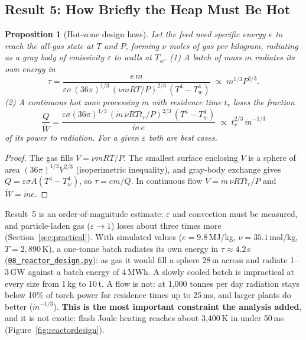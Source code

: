 \documentclass[11pt,a4paper]{article}
\newcommand{\gh}[2]{\href{https://github.com/syncaissa/paramanu-reclaimer/blob/main/#1}{\texttt{#2}}}
\theoremstyle{definition}
\theoremstyle{plain}
\newtheorem{proposition}{Proposition}[section]
\theoremstyle{remark}
\begin{document}
\subsection{Result 5: How Briefly the Heap Must Be Hot}
\begin{proposition}[Hot-zone design laws]\label{prop:hotzone}
Let the feed need specific energy $e$ to reach the all-gas state at $T$ and $P$, forming $\nu$ moles of gas per kilogram, radiating as a gray body of emissivity $\varepsilon$ to walls at $T_w$. (1) A batch of mass $m$ radiates its own energy in
\begin{equation}\label{eq:tau}
\tau = \frac{e\,m}{\varepsilon\sigma\,(36\pi)^{1/3}\,(\nu m R T/P)^{2/3}\,(T^4 - T_w^4)} \;\propto\; m^{1/3}P^{2/3}.
\end{equation}
(2) A continuous hot zone processing $\dot m$ with residence time $t_r$ loses the fraction
\begin{equation}\label{eq:flowloss}
\frac{Q}{\dot W} = \frac{\varepsilon\sigma(36\pi)^{1/3}\,(\dot m\,\nu R T t_r/P)^{2/3}\,(T^4-T_w^4)}{\dot m\,e} \;\propto\; t_r^{2/3}\,\dot m^{-1/3}
\end{equation}
of its power to radiation. For a given $\varepsilon$ both are best cases.
\end{proposition}
\begin{proof}
The gas fills $V = \nu m RT/P$. The smallest surface enclosing $V$ is a sphere of area $(36\pi)^{1/3}V^{2/3}$ (isoperimetric inequality), and gray-body exchange gives $Q = \varepsilon\sigma A(T^4-T_w^4)$, so $\tau = em/Q$. In continuous flow $V = \dot m\,\nu RT t_r/P$ and $\dot W = \dot m e$.
\end{proof}
Result~5 is an order-of-magnitude estimate: $\varepsilon$ and convection must be measured, and particle-laden gas ($\varepsilon \to 1$) loses about three times more (Section~\ref{sec:practical}). With simulated values ($e = 9.8$\,MJ/kg, $\nu = 35.1$\,mol/kg, $T = 2{,}890$\,K), a one-tonne batch radiates its own energy in $\tau \approx 4.2$\,s (\gh{simulation/scripts/08_reactor_design.py}{08\_reactor\_design.py}): as gas it would fill a sphere 28\,m across and radiate 1--3\,GW against a batch energy of 4\,MWh. A slowly cooled batch is impractical at every size from 1\,kg to 10\,t. A flow is not: at 1,000 tonnes per day radiation stays below 10\% of torch power for residence times up to 25\,ms, and larger plants do better ($\dot m^{-1/3}$). \textbf{This is the most important constraint the analysis added}, and it is not exotic: flash Joule heating reaches about 3,400\,K in under 50\,ms \citep{deng2021} (Figure~\ref{fig:reactordesign}).
\end{document}
